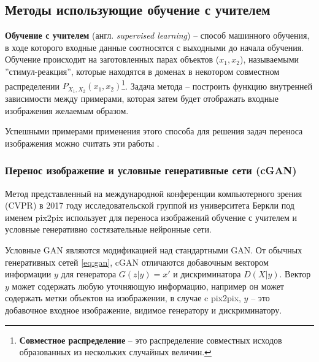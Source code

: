 \documentclass[11pt,a4paper]{extarticle}
\begin{document}
		\subsection{Методы использующие обучение с учителем}
		
			\textbf{Обучение с учителем} (англ. \textit{supervised learning}) -- способ машинного обучения, в ходе которого входные данные соотносятся с выходными до начала обучения.
			Обучение происходит на заготовленных парах объектов (\(x_{1},x_{2}\)), называемыми ''стимул-реакция'', которые находятся в доменах в некотором совместном распределении \(P_{X_{1},X_{2}}(x_{1},x_{2})\)\footnote{
				\textbf{Совместное распределение} -- это распределение совместных исходов образованных из нескольких случайных величин.
			}.
			Задача метода -- построить функцию внутренней зависимости между примерами, которая затем будет отображать входные изображения желаемым образом.

			Успешными примерами применения этого способа для решения задач переноса изображения можно считать эти работы \cite{BicycleGAN, pix2pix}.

			\subsubsection{Перенос изображение и условные генеративные сети (cGAN)}
				Метод представленный на международной конференции компьютерного зрения (CVPR) в 2017 году
				исследовательской группой из университета Беркли под именем pix2pix \cite{pix2pix}
				использует для переноса изображений обучение с учителем и условные генеративно состязательные нейронные сети.

				Условные GAN являются модификацией над стандартными GAN.
				От обычных генеративных сетей \eqref{eq:gan}, cGAN отличаются добавочным вектором информации $y$ для генератора \(G(z|y) = x'\) и дискриминатора \(D(X|y)\).
				Вектор $y$ может содержать любую уточняющую информацию, например он может содержать метки объектов на изображении,
				в случае c pix2pix, $y$ -- это добавочное входное изображение, видимое генератору и дискриминатору.
\end{document}

